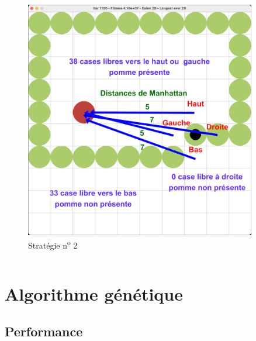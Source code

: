 \documentclass[10pt]{beamer}
\begin{document}
\begin{frame}
\begin{columns}[T]
\begin{column}{0.40\textwidth}
\begin{figure}
\vspace{-0.6cm}
\includegraphics[width=0.9\textwidth]{snake_vision_illustration2.png}
\caption*{\tiny Stratégie n\textsuperscript{o} 2}
\end{figure}

\end{column}
\end{columns}
\end{frame}

\section{Algorithme génétique}

\subsection{Performance}
\end{document}
